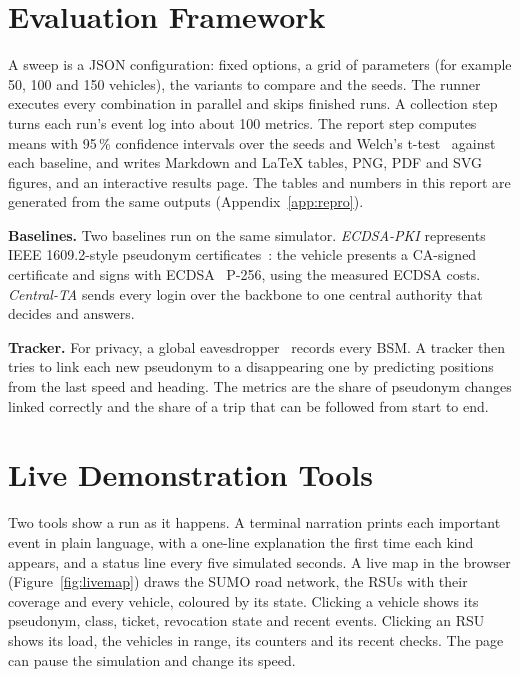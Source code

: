 \section{Evaluation Framework}\label{sec:eval-framework}

A sweep is a JSON configuration: fixed options, a grid of parameters (for example 50, 100 and 150
vehicles), the variants to compare and the seeds. The runner executes every combination in parallel
and skips finished runs. A collection step turns each run's event log into about 100 metrics. The
report step computes means with 95\,\% confidence intervals over the seeds and Welch's
t-test~\cite{welch1947} against each baseline, and writes Markdown and LaTeX tables, PNG, PDF and SVG
figures, and an interactive results page. The tables and numbers in this report are generated from
the same outputs (Appendix~\ref{app:repro}).

\textbf{Baselines.} Two baselines run on the same simulator. \emph{ECDSA-PKI} represents IEEE
1609.2-style pseudonym certificates~\cite{ieee16092}: the vehicle presents a CA-signed certificate and signs with
ECDSA~\cite{johnson2001ecdsa} P-256, using the measured ECDSA costs. \emph{Central-TA} sends every login over the backbone
to one central authority that decides and answers.

\textbf{Tracker.} For privacy, a global eavesdropper~\cite{gruteser2005tracking} records every BSM. A tracker then tries to link
each new pseudonym to a disappearing one by predicting positions from the last speed and heading. The
metrics are the share of pseudonym changes linked correctly and the share of a trip that can be
followed from start to end.

\section{Live Demonstration Tools}

Two tools show a run as it happens. A terminal narration prints each important event in plain
language, with a one-line explanation the first time each kind appears, and a status line every five
simulated seconds. A live map in the browser (Figure~\ref{fig:livemap}) draws the SUMO road network,
the RSUs with their coverage and every vehicle, coloured by its state. Clicking a vehicle shows its
pseudonym, class, ticket, revocation state and recent events. Clicking an RSU shows its load, the
vehicles in range, its counters and its recent checks. The page can pause the simulation and change
its speed.

